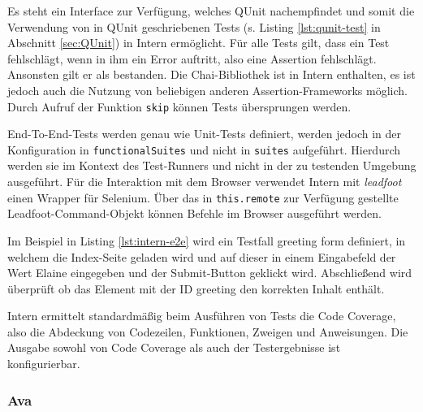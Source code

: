 \begin{figure}[H]
	
\end{figure}

Es steht ein Interface zur Verfügung, welches QUnit nachempfindet und somit die Verwendung von in QUnit geschriebenen Tests (s. Listing \ref{lst:qunit-test} in Abschnitt \ref{sec:QUnit}) in Intern ermöglicht. Für alle Tests gilt, dass ein Test fehlschlägt, wenn in ihm ein Error auftritt, also eine Assertion fehlschlägt. Ansonsten gilt er als bestanden. Die Chai-Bibliothek ist in Intern enthalten, es ist jedoch auch die Nutzung von beliebigen anderen Assertion-Frameworks möglich. Durch Aufruf der Funktion \texttt{skip} können Tests übersprungen werden.\cite{intern-userguide}

End-To-End-Tests werden genau wie Unit-Tests definiert, werden jedoch in der Konfiguration in \texttt{functionalSuites} und nicht in \texttt{suites} aufgeführt. Hierdurch werden sie im Kontext des Test-Runners und nicht in der zu testenden Umgebung ausgeführt. Für die Interaktion mit dem Browser verwendet Intern mit \textit{leadfoot} einen Wrapper für Selenium. Über das in \texttt{this.remote} zur Verfügung gestellte Leadfoot-Command-Objekt können Befehle im Browser ausgeführt werden.\cite{intern-userguide}

\begin{figure}[H]
	
\end{figure}

Im Beispiel in Listing \ref{lst:intern-e2e} wird ein Testfall \glqq greeting form\grqq{} definiert, in welchem die Index-Seite geladen wird und auf dieser in einem Eingabefeld der Wert \glqq Elaine\grqq{} eingegeben und der Submit-Button geklickt wird. Abschließend wird überprüft ob das Element mit der ID \glqq greeting\grqq{} den korrekten Inhalt enthält.

Intern ermittelt standardmäßig beim Ausführen von Tests die Code Coverage, also die Abdeckung von Codezeilen, Funktionen, Zweigen und Anweisungen. Die Ausgabe sowohl von Code Coverage als auch der Testergebnisse ist konfigurierbar.\cite{intern-userguide}


\subsubsection{Ava}
\label{sec:Ava}

